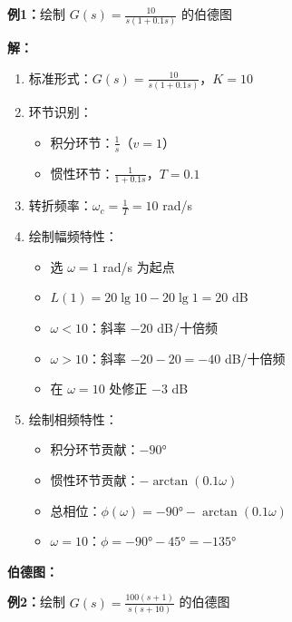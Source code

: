 \textbf{例1：}绘制 $G(s) = \frac{10}{s(1+0.1s)}$ 的伯德图

\textbf{解：}
\begin{enumerate}
    \item 标准形式：$G(s) = \frac{10}{s(1+0.1s)}$，$K = 10$
    \item 环节识别：
    \begin{itemize}
        \item 积分环节：$\frac{1}{s}$（$v=1$）
        \item 惯性环节：$\frac{1}{1+0.1s}$，$T=0.1$
    \end{itemize}
    \item 转折频率：$\omega_c = \frac{1}{T} = 10$ rad/s
    \item 绘制幅频特性：
    \begin{itemize}
        \item 选 $\omega = 1$ rad/s 为起点
        \item $L(1) = 20\lg 10 - 20\lg 1 = 20$ dB
        \item $\omega < 10$：斜率 $-20$ dB/十倍频
        \item $\omega > 10$：斜率 $-20-20 = -40$ dB/十倍频
        \item 在 $\omega = 10$ 处修正 $-3$ dB
    \end{itemize}
    \item 绘制相频特性：
    \begin{itemize}
        \item 积分环节贡献：$-90°$
        \item 惯性环节贡献：$-\arctan(0.1\omega)$
        \item 总相位：$\phi(\omega) = -90° - \arctan(0.1\omega)$
        \item $\omega = 10$：$\phi = -90° - 45° = -135°$
    \end{itemize}
\end{enumerate}

\textbf{伯德图：}
\begin{center}
\end{center}

\textbf{例2：}绘制 $G(s) = \frac{100(s+1)}{s(s+10)}$ 的伯德图

